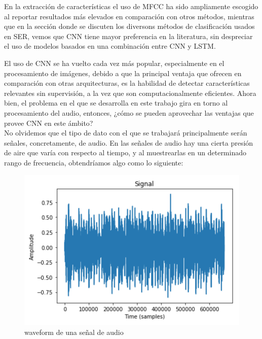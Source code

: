 \documentclass[11pt,a4paper,spanish]{book}
\begin{document}
	En la extracción de características el uso de MFCC ha sido ampliamente escogido al reportar resultados más elevados en comparación con otros métodos, mientras que en la sección donde se discuten los diversons métodos de clasificación usados en SER, vemos que CNN tiene mayor preferencia en la literatura, sin despreciar el uso de modelos basados en una combinación entre CNN y LSTM.\hfill \break
	
	El uso de CNN se ha vuelto cada vez más popular, especialmente en el procesamiento de imágenes, debido a que la principal ventaja que ofrecen en comparación con otras arquitecturas, es la habilidad de detectar características relevantes sin supervisión, a la vez que son computacionalmente eficientes.
	Ahora bien, el problema en el que se desarrolla en este trabajo gira en torno al procesamiento del audio, entonces, ¿cómo se pueden aprovechar las ventajas que provee CNN en este ámbito?\\
	No olvidemos que el tipo de dato con el que se trabajará principalmente serán señales, concretamente, de audio. En las señales de audio hay una cierta presión de aire que varía con respecto al tiempo, y al muestrearlas en un determinado rango de frecuencia, obtendríamos algo como lo siguiente:\\
	
	\begin{figure}[h]
		\centering
		\includegraphics[scale=0.3]{waveform.png}
		\caption{waveform de una señal de audio}
	\end{figure}
\end{document}
